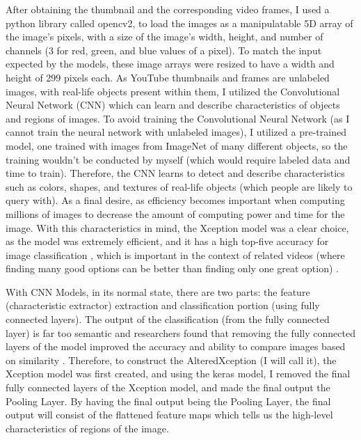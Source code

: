\documentclass[10pt,twocolumn]{article}
\begin{document}
After obtaining the thumbnail and the corresponding video frames, I used a python library called opencv2, to load the images as a manipulatable 5D array of the image's pixels, with a size of the image's width, height, and number of channels (3 for red, green, and blue values of a pixel). To match the input expected by the models, these image arrays were resized to have a width and height of 299 pixels each. As YouTube thumbnails and frames are unlabeled images, with real-life objects present within them, I utilized the Convolutional Neural Network (CNN) which can learn and describe characteristics of objects and regions of images. To avoid training the Convolutional Neural Network (as I cannot train the neural network with unlabeled images), I utilized a pre-trained model, one trained with images from ImageNet of many different objects, so the training wouldn't be conducted by myself (which would require labeled data and time to train). Therefore, the CNN learns to detect and describe characteristics such as colors, shapes, and textures of real-life objects (which people are likely to query with). As a final desire, as efficiency becomes important when computing millions of images to decrease the amount of computing power and time for the image. With this characteristics in mind, the Xception model was a clear choice, as the model was extremely efficient, and it has a high top-five accuracy for image classification \cite{Chollet2017}, which is important in the context of related videos (where finding many good options can be better than finding only one great option) \cite{Stancic2022}. 

With CNN Models, in its normal state, there are two parts: the feature (characteristic extractor) extraction and classification portion (using fully connected layers). The output of the classification (from the fully connected layer) is far too semantic and researchers found that removing the fully connected layers of the model improved the accuracy and ability to compare images based on similarity \cite{Qian2020}. Therefore, to construct the AlteredXception (I will call it), the Xception model was first created, and using the keras model, I removed the final fully connected layers of the Xception model, and made the final output the Pooling Layer. By having the final output being the Pooling Layer, the final output will consist of the flattened feature maps which tells us the high-level characteristics of regions of the image.
\end{document}
